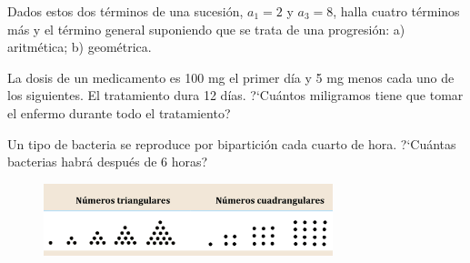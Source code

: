 \begin{mipropuesto}

Dados estos dos términos de una sucesión, $a_1 = 2$ y $a_3 = 8$, halla cuatro términos más y el término
general suponiendo que se trata de una progresión: a) aritmética; b) geométrica.
\end{mipropuesto}

\vspace{-8mm}
\begin{flushright}
\begin{footnotesize} \textcolor{gris}{}	\end{footnotesize}
\end{flushright}



\begin{mipropuesto}

La dosis de un medicamento es 100 mg el primer día y 5 mg menos cada uno de los siguientes. El tratamiento dura 12 días. ?`Cuántos miligramos tiene que tomar el enfermo durante todo el tratamiento?
\end{mipropuesto}

\vspace{-8mm}
\begin{flushright}
\begin{footnotesize} \textcolor{gris}{}	\end{footnotesize}
\end{flushright}



\begin{mipropuesto}

Un tipo de bacteria se reproduce por bipartición cada cuarto de hora. ?`Cuántas bacterias habrá después de 6 horas?

\end{mipropuesto}

\vspace{-8mm}
\begin{flushright}
\begin{footnotesize} \textcolor{gris}{}	\end{footnotesize}
\end{flushright}


\begin{mipropuesto}

\begin{figure}[H]
	\centering
	\includegraphics[width=0.75\textwidth]{img-suc/suc07.png}
\end{figure}


\end{mipropuesto}

